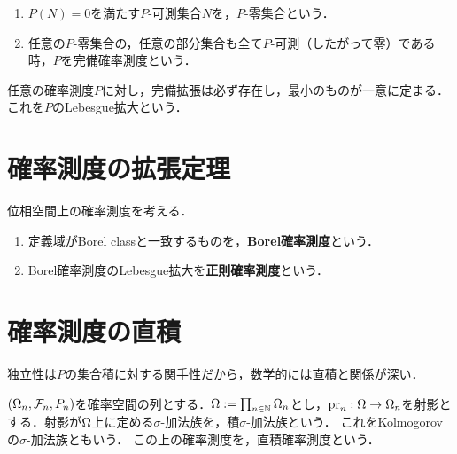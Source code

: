 \documentclass[uplatex,dvipdfmx]{jsreport}
\begin{document}
\begin{definition}\mbox{}\label{def-complete-measure}
    \begin{enumerate}
        \item $P(N)=0$を満たす$P$-可測集合$N$を，$P$-零集合という．
        \item 任意の$P$-零集合の，任意の部分集合も全て$P$-可測（したがって零）である時，$P$を完備確率測度という．
    \end{enumerate}
\end{definition}

\begin{proposition}
    任意の確率測度$P$に対し，完備拡張は必ず存在し，最小のものが一意に定まる．これを$P$のLebesgue拡大という．
\end{proposition}

\section{確率測度の拡張定理}

\begin{definition}\label{def-regular-measure}
    位相空間上の確率測度を考える．
    \begin{enumerate}
        \item 定義域がBorel classと一致するものを，\textbf{Borel確率測度}という．
        \item Borel確率測度のLebesgue拡大を\textbf{正則確率測度}という．
    \end{enumerate}
\end{definition}

\section{確率測度の直積}

\begin{tcolorbox}[colframe=ForestGreen, colback=ForestGreen!10!white,breakable,colbacktitle=ForestGreen!40!white,coltitle=black,fonttitle=\bfseries\sffamily,
title=]
    独立性は$P$の集合積に対する関手性だから，数学的には直積と関係が深い．
\end{tcolorbox}

\begin{definition}
    $(\Omega_n,\mathcal{F}_n,P_n)$を確率空間の列とする．$\Omega:=\prod_{n\in\mathbb{N}}\Omega_n$とし，$\mathrm{pr}_n:\Omega\to\Omega_n$を射影とする．射影が$\Omega$上に定める$\sigma$-加法族を，積$\sigma$-加法族という．
    これをKolmogorovの$\sigma$-加法族ともいう．
    この上の確率測度を，直積確率測度という．
\end{definition}
\end{document}
